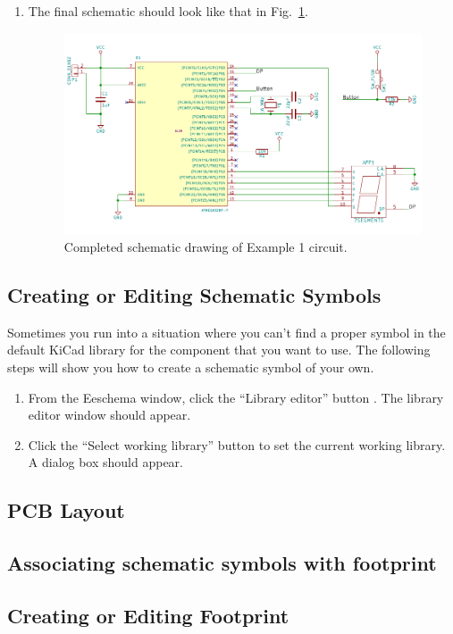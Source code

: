 \documentclass[12pt,letterpaper]{scrartcl}
\begin{document}
\begin{enumerate}
	\item The final schematic should look like that in Fig.~\ref{fig:example1-schematic-final}.
		\begin{figure}[h]
			\centering
			\includegraphics{example1-schematic-final}
			\caption{Completed schematic drawing of Example 1 circuit.}
			\label{fig:example1-schematic-final}
		\end{figure}		
\end{enumerate}

\newpage
\subsection{Creating or Editing Schematic Symbols}
Sometimes you run into a situation where you can’t find a proper symbol in the default KiCad library for the component that you want to use. The following steps will show you how to create a schematic symbol of your own. 

\begin{enumerate}
	\item From the Eeschema window, click the “Library editor” button .
	The library editor window should appear.
	\item Click the “Select working library” button  to set the current working library. A dialog box should appear. 
	
	
\end{enumerate}
\subsection{PCB Layout}
\subsection{Associating schematic symbols with footprint}
\subsection{Creating or Editing Footprint}
\end{document}
